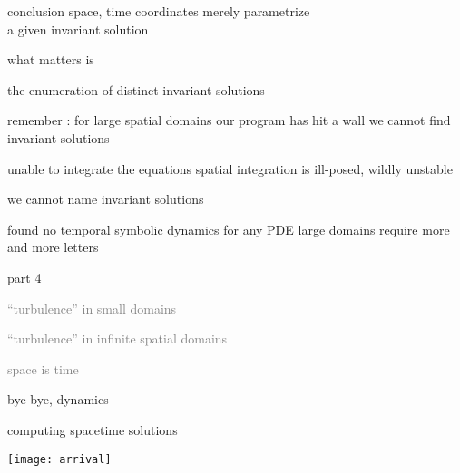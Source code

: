 
\begin{frame}{conclusion}
space, time coordinates merely parametrize
\\
a given invariant solution

\bigskip

what matters is

\vfill

{\Large
the enumeration of distinct invariant solutions
                  }
\end{frame}

\begin{frame}{remember : for large spatial domains our program has hit a wall}
we cannot {\color{red}find} invariant solutions
\begin{block}{unable to integrate the equations }
{\Large
spatial integration is ill-posed, wildly  unstable
                  }
\end{block}


\vfill
we cannot {\color{red}name} invariant solutions
\begin{block}{found no temporal symbolic dynamics for any PDE}
{\Large
large domains require more and more letters
}
\end{block}
\end{frame}


\begin{frame}{part 4}
\begin{enumerate}
              \item
    \textcolor{gray}{\small
``turbulence'' in small domains
              \item
``turbulence'' in infinite spatial domains
              \item
space is time
    }
              \item
    {\Large
bye bye, dynamics
    }
            \end{enumerate}
\end{frame}

\begin{frame}{computing spacetime solutions}
\begin{center}
\texttt{[image: arrival]}
\end{center}
\end{frame}

